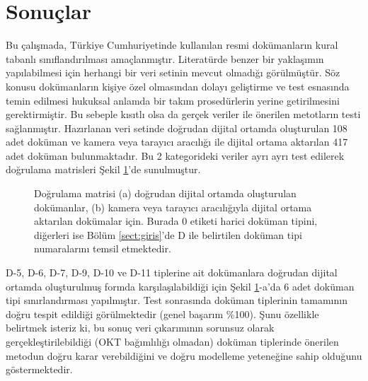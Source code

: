 \documentclass[conference, a4paper]{IEEEtran}
\begin{document}
\section{Sonuçlar}
\label{sec:result}
Bu çalışmada, Türkiye Cumhuriyetinde kullanılan resmi dokümanların kural tabanlı sınıflandırılması amaçlanmıştır.
Literatürde benzer bir yaklaşımın yapılabilmesi için herhangi bir veri setinin mevcut olmadığı görülmüştür. Söz konusu
dokümanların kişiye özel olmasından dolayı geliştirme ve test esnasında temin edilmesi hukuksal anlamda bir takım
prosedürlerin yerine getirilmesini gerektirmiştir. Bu sebeple kısıtlı olsa da gerçek veriler ile önerilen metotların
testi sağlanmıştır. Hazırlanan veri setinde doğrudan dijital ortamda oluşturulan 108 adet doküman ve kamera veya
tarayıcı aracılığı ile dijital ortama aktarılan 417 adet doküman bulunmaktadır. Bu 2 kategorideki veriler ayrı ayrı
test edilerek doğrulama matrisleri Şekil \ref{fig:dogrulamamatrisi}'de sunulmuştur.

\begin{figure}[th]
    \centering
    \shorthandoff{=}
    \par\medskip
    \shorthandon{=}
    \caption{Doğrulama matrisi (a) doğrudan dijital ortamda oluşturulan dokümanlar, (b) kamera veya tarayıcı
        aracılığıyla dijital ortama aktarılan dokümalar için. Burada $0$ etiketi harici doküman tipini, diğerleri ise
        Bölüm \ref{sect:giris}'de D ile belirtilen doküman tipi numaralarını temsil etmektedir.}
    \label{fig:dogrulamamatrisi}
\end{figure}

D-5, D-6, D-7, D-9, D-10 ve D-11 tiplerine ait dokümanlara doğrudan dijital ortamda oluşturulmuş formda
karşılaşılabildiği için Şekil \ref{fig:dogrulamamatrisi}-a'da 6 adet doküman tipi sınırlandırması yapılmıştır. Test
sonrasında doküman tiplerinin tamamının doğru tespit edildiği görülmektedir (genel başarım \%100). Şunu özellikle
belirtmek isteriz ki, bu sonuç veri çıkarımının sorunsuz olarak gerçekleştirilebildiği (OKT bağımlılığı olmadan)
doküman tiplerinde önerilen metodun doğru karar verebildiğini ve doğru modelleme yeteneğine sahip olduğunu
göstermektedir.
\end{document}
